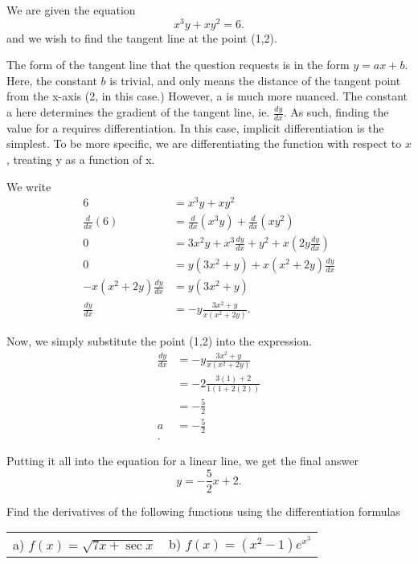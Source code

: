 \documentclass[a4paper]{article}
\begin{document}
\vspace{5pt}
\noindent We are given the equation \[
x^3y + xy^2 = 6
.\]  and we wish to find the tangent line at the point (1,2).

The form of the tangent line that the question requests is in the form $y = ax + b$. Here, the constant $b$ is trivial, and only means the distance of the tangent point from the x-axis (2, in this case.) However, a is much more nuanced. The constant a here determines the gradient of the tangent line, ie.  $\frac{dy}{dx}$. As such, finding the value for a requires differentiation. In this case, implicit differentiation is the simplest. To be more specific, we are differentiating the function with respect to $x$, treating y as a function of x.

\noindent We write
\begin{align*}
	6 &= x^3y + xy^2 \\
	\frac{d}{dx} (6) &= \frac{d}{dx}(x^3y) + \frac{d}{dx}(xy^2) \\
	0 &= 3x^2y + x^3\frac{dy}{dx} + y^2 + x(2y \frac{dy}{dx}) \\
	0 &= y(3x^2 + y) + x(x^2 + 2y) \frac{dy}{dx} \\
	-x(x^2 + 2y) \frac{dy}{dx} &= y(3x^2 + y) \\
	\frac{dy}{dx} &= - y\frac{3x^2 + y}{x(x^2+2y)} 
.\end{align*}

Now, we simply substitute the point (1,2) into the expression.
\begin{align*}
	\frac{dy}{dx} &= - y\frac{3x^2 + y}{x(x^2+2y)} \\
		      &=  - 2\frac{3(1) + 2}{1(1+2(2))}\\
		      &= - \frac{5}{2} \\
		      a &= - \frac{5}{2} \\
.\end{align*}

Putting it all into the equation for a linear line, we get the final answer \[
	\boxed{y = - \frac{5}{2} x + 2}
.\] 

\begin{tcolorbox}[title= Question 4]
	Find the derivatives of the following functions using the differentiation formulas

	\centering	
	\begin{tabular}{lr}
		a) $f(x) = \sqrt{7x + \sec x} $ & b) $f(x) = (x^2 - 1)e^{x^{3}} $	
	\end{tabular}
\end{tcolorbox}
\end{document}
